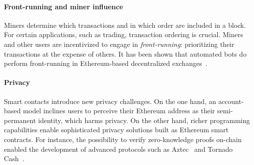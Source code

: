 \paragraph{Front-running and miner influence}
Miners determine which transactions and in which order are included in a block.
For certain applications, such as trading, transaction ordering is crucial.
Miners and other users are incentivized to engage in \textit{front-running}: prioritizing their transactions at the expense of others.
It has been shown that automated bots do perform front-running in Ethereum-based decentralized exchanges~\cite{Daian2019,Robinson2020}.

\paragraph{Privacy}
Smart contacts introduce new privacy challenges.
On the one hand, an account-based model inclines users to perceive their Ethereum address as their semi-permanent identity, which harms privacy.
On the other hand, richer programming capabilities enable sophisticated privacy solutions built as Ethereum smart contracts.
For instance, the possibility to verify zero-knowledge proofs on-chain enabled the development of advanced protocols such as Aztec~\cite{Aztec} and Tornado Cash~\cite{TornadoCash}.
